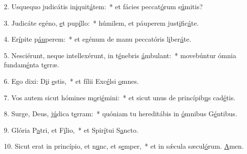 2. Usquequo judicátis in\uline{i}quit\uline{á}tem:~* et fácies peccat\uline{ó}rum s\uline{ú}mitis?\par 
3. Judicáte egéno, \uline{e}t pup\uline{í}llo:~* húmilem, et páuperem just\uline{i}fic\uline{á}te.\par 
4. Er\uline{í}pite p\uline{áu}perem:~* et egénum de manu peccatóris l\uline{i}ber\uline{á}te.\par 
5. Nesciérunt, neque intellexérunt, in t\uline{é}nebris \uline{á}mbulant:~* movebúntur ómnia fundam\uline{é}nta t\uline{e}rræ.\par 
6. Ego dixi: D\uline{i}i \uline{e}stis,~* et fílii Exc\uline{é}lsi \uline{o}mnes.\par 
7. Vos autem sicut hómines m\uline{o}ri\uline{é}mini:~* et sicut unus de princípib\uline{u}s cad\uline{é}tis.\par 
8. Surge, Deus, j\uline{ú}dica t\uline{e}rram:~* quóniam tu hereditábis in \uline{ó}mnibus G\uline{é}ntibus.\par 
9. Glória P\uline{a}tri, et F\uline{í}lio,~* et Spir\uline{í}tui S\uline{a}ncto.\par 
10. Sicut erat in princípio, et n\uline{u}nc, et s\uline{e}mper,~* et in sǽcula sæcul\uline{ó}rum. \uline{A}men.\par 
